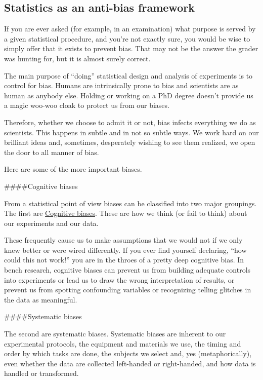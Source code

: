 \documentclass[]{book}
\begin{document}
\hypertarget{statistics-as-an-anti-bias-framework}{%
\subsection{Statistics as an anti-bias framework}\label{statistics-as-an-anti-bias-framework}}

If you are ever asked (for example, in an examination) what purpose is served by a given statistical procedure, and you're not exactly sure, you would be wise to simply offer that it exists to prevent bias. That may not be the answer the grader was hunting for, but it is almost surely correct.

The main purpose of ``doing'' statistical design and analysis of experiments is to control for bias. Humans are intrinsically prone to bias and scientists are as human as anybody else. Holding or working on a PhD degree doesn't provide us a magic woo-woo cloak to protect us from our biases.

Therefore, whether we choose to admit it or not, bias infects everything we do as scientists. This happens in subtle and in not so subtle ways. We work hard on our brilliant ideas and, sometimes, desperately wishing to see them realized, we open the door to all manner of bias.

Here are some of the more important biases.

\#\#\#\#Cognitive biases

From a statistical point of view biases can be classified into two major groupings. The first are \href{https://en.wikipedia.org/wiki/List_of_cognitive_biases}{Cognitive biases}. These are how we think (or fail to think) about our experiments and our data.

These frequently cause us to make assumptions that we would not if we only knew better or were wired differently. If you ever find yourself declaring, ``how could this not work!'' you are in the throes of a pretty deep cognitive bias. In bench research, cognitive biases can prevent us from building adequate controls into experiments or lead us to draw the wrong interpretation of results, or prevent us from spotting confounding variables or recognizing telling glitches in the data as meaningful.

\#\#\#\#Systematic biases

The second are systematic biases. Systematic biases are inherent to our experimental protocols, the equipment and materials we use, the timing and order by which tasks are done, the subjects we select and, yes (metaphorically), even whether the data are collected left-handed or right-handed, and how data is handled or transformed.
\end{document}
